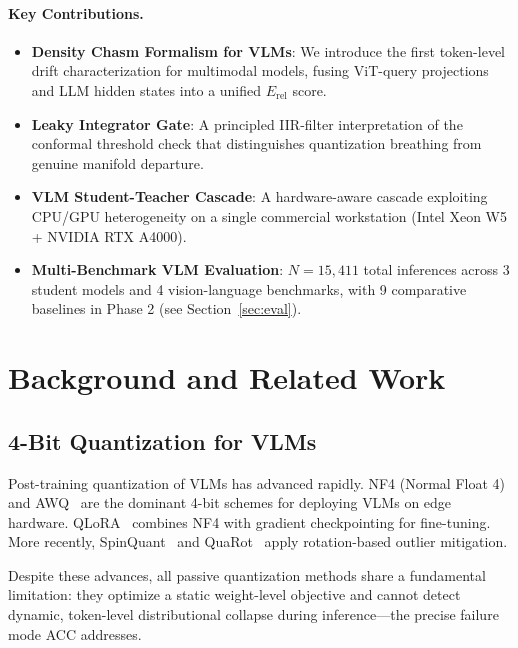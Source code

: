 \documentclass[runningheads]{llncs}
\newcommand{\Erel}{E_\mathrm{rel}}
\begin{document}
\paragraph{Key Contributions.}
\begin{itemize}[itemsep=0pt]
  \item \textbf{Density Chasm Formalism for VLMs}: We introduce the first
    token-level drift characterization for multimodal models, fusing
    ViT-query projections and LLM hidden states into a unified $\Erel$
    score.
  \item \textbf{Leaky Integrator Gate}: A principled IIR-filter interpretation
    of the conformal threshold check that distinguishes quantization breathing
    from genuine manifold departure.
  \item \textbf{VLM Student-Teacher Cascade}: A hardware-aware cascade
    exploiting CPU/GPU heterogeneity on a single commercial workstation
    (Intel Xeon W5 + NVIDIA RTX A4000).
  \item \textbf{Multi-Benchmark VLM Evaluation}: $N=15{,}411$ total inferences
    across 3 student models and 4 vision-language benchmarks, with 9
    comparative baselines in Phase 2 (see Section~\ref{sec:eval}).
\end{itemize}

\section{Background and Related Work}
\label{sec:related}

\subsection{4-Bit Quantization for VLMs}

Post-training quantization of VLMs has advanced rapidly.
NF4 (Normal Float 4)~\cite{dettmers2023qlora} and AWQ~\cite{lin2023awq}
are the dominant 4-bit schemes for deploying VLMs on edge hardware.
QLoRA~\cite{dettmers2023qlora} combines NF4 with gradient checkpointing for
fine-tuning. More recently, SpinQuant~\cite{dettmers2024spinquant} and
QuaRot~\cite{ashkboos2024quarot} apply rotation-based outlier mitigation.

Despite these advances, all passive quantization methods share a fundamental
limitation: they optimize a static weight-level objective and cannot detect
dynamic, token-level distributional collapse during inference---the precise
failure mode ACC addresses.
\end{document}
